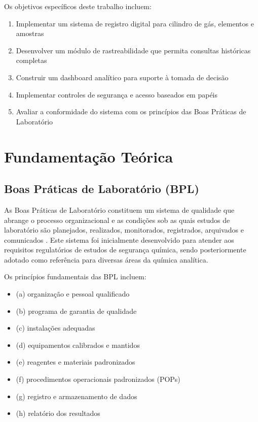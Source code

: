 \documentclass[12pt,a4paper]{article}
\begin{document}
Os objetivos específicos deste trabalho incluem:

\begin{enumerate}
\item Implementar um sistema de registro digital para cilindro de gás, elementos e amostras
\item Desenvolver um módulo de rastreabilidade que permita consultas históricas completas
\item Construir um dashboard analítico para suporte à tomada de decisão
\item Implementar controles de segurança e acesso baseados em papéis
\item Avaliar a conformidade do sistema com os princípios das Boas Práticas de Laboratório
\end{enumerate}

\section{Fundamentação Teórica}

\subsection{Boas Práticas de Laboratório (BPL)}

As Boas Práticas de Laboratório constituem um sistema de qualidade que abrange o processo organizacional e as condições sob as quais estudos de laboratório são planejados, realizados, monitorados, registrados, arquivados e comunicados \cite{oecd1998}. Este sistema foi inicialmente desenvolvido para atender aos requisitos regulatórios de estudos de segurança química, sendo posteriormente adotado como referência para diversas áreas da química analítica.

Os princípios fundamentais das BPL incluem:

\begin{itemize}
\item (a) organização e pessoal qualificado
\item (b) programa de garantia de qualidade
\item (c) instalações adequadas
\item (d) equipamentos calibrados e mantidos
\item (e) reagentes e materiais padronizados
\item (f) procedimentos operacionais padronizados (POPs)
\item (g) registro e armazenamento de dados
\item (h) relatório dos resultados \cite{anvisa2009}
\end{itemize}
\end{document}
